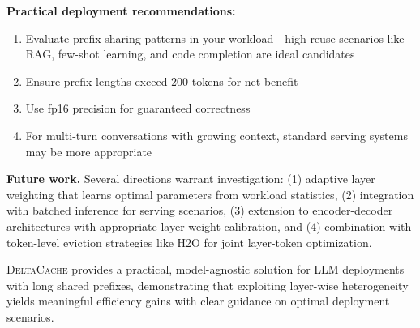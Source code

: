 \documentclass[10pt,conference]{IEEEtran}
\newcommand{\deltacache}{\textsc{DeltaCache}}
\begin{document}
\textbf{Practical deployment recommendations:}
\begin{enumerate}
\item Evaluate prefix sharing patterns in your workload---high reuse scenarios like RAG, few-shot learning, and code completion are ideal candidates
\item Ensure prefix lengths exceed 200 tokens for net benefit
\item Use fp16 precision for guaranteed correctness
\item For multi-turn conversations with growing context, standard serving systems may be more appropriate
\end{enumerate}

\textbf{Future work.} Several directions warrant investigation: (1) adaptive layer weighting that learns optimal parameters from workload statistics, (2) integration with batched inference for serving scenarios, (3) extension to encoder-decoder architectures with appropriate layer weight calibration, and (4) combination with token-level eviction strategies like H2O for joint layer-token optimization.

\deltacache{} provides a practical, model-agnostic solution for LLM deployments with long shared prefixes, demonstrating that exploiting layer-wise heterogeneity yields meaningful efficiency gains with clear guidance on optimal deployment scenarios.



\end{document}
